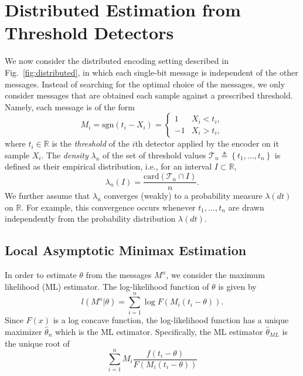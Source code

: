 \documentclass[letterpaper, conference, 11pt]{IEEEtran}      %
\newcommand{\card}{\mathrm{card}}
\newcommand{\sgn}{\mathrm{sgn} }
\begin{document}
\section{Distributed Estimation from Threshold Detectors \label{sec:distributed}}
We now consider the distributed encoding setting described in Fig.~\ref{fig:distributed}, in which each single-bit message is independent of the other messages. Instead of searching for the optimal choice of the messages, we only consider messages that are obtained each sample against a prescribed threshold. Namely, each message is of the form
\begin{equation}
\label{eq:threshold_message}
M_i = \sgn(t_i - X_i) = \begin{cases} 1 & X_i< t_i, \\
-1 & X_i > t_i,
\end{cases}  
\end{equation}
where $t_i\in\mathbb R$ is the \emph{threshold} of the $i$th detector applied by the encoder on it sample $X_i$. The \emph{density} $\lambda_n$ of the set of threshold values $\mathcal T_n  \triangleq \left\{t_1,\ldots,t_n \right\}$ is defined as their empirical distribution, i.e., for an interval $I \subset \mathbb R$, 
\[
\lambda_n(I) = \frac{ \card \left( \mathcal T_n \cap I \right)}{n}.
\]
We further assume that $\lambda_n$ converges (weakly) to a probability measure $\lambda(dt)$ on $\mathbb R$. For example, this convergence occurs whenever $t_1,\ldots,t_n$ are drawn independently from the probability distribution $\lambda(dt)$. 
 \\

\subsection{Local Asymptotic Minimax Estimation}

In order to estimate $\theta$ from the messages $M^n$, we consider the maximum likelihood (ML) estimator. The log-likelihood function of $\theta$ is given by
\[
l(M^n  |\theta ) =  \sum_{i=1}^n \log F \left( M_i \left( t_i - \theta \right) \right). 
\]
Since $F(x)$ is a log concave function, the log-likelihood function has a unique maximizer $\hat{\theta}_n$ which is the ML estimator. Specifically, the ML estimator $\hat{\theta}_{ML}$ is the unique root of 
\[
\sum_{i=1}^n M_i \frac{f \left( t_i-\theta\right) }{F \left(M_i  (t_i-\theta)\right) } 
\]
\end{document}
